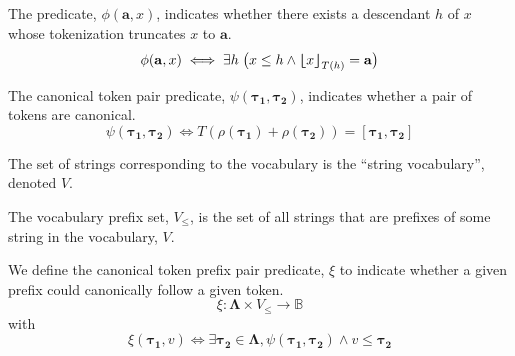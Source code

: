 \begin{definition}
    The predicate, $\phi(\mathbf{a}, x)$, indicates whether there exists a descendant $h$ of $x$
    whose tokenization truncates $x$ to $\mathbf{a}$.
    $$
    \phi(\mathbf{a}, x)
    \iff
    \exists h \;\bigl( x \leq h \land {\bm{\lfloor}} x {\bm{\rfloor}}_{T(h)} = \mathbf{a} \bigr)
    $$
\end{definition}

\begin{definition}
    The canonical token pair predicate, $\psi(\boldsymbol{\tau_1}, \boldsymbol{\tau_2})$, indicates whether a pair of tokens are canonical.
    $$
    \psi(\boldsymbol{\tau_1}, \boldsymbol{\tau_2})
    \iff
    T(\rho(\boldsymbol{\tau_1}) + \rho(\boldsymbol{\tau_2})) = [\boldsymbol{\tau_1}, \boldsymbol{\tau_2}]
    $$
\end{definition}

\begin{definition}
    The set of strings corresponding to the vocabulary
    is the ``string vocabulary'', denoted $V$.
\end{definition}

\begin{definition}
    The vocabulary prefix set, $V_{\leq}$,
    is the set of all strings that are prefixes of some string in the vocabulary, $V$.
\end{definition}

\begin{definition}
    We define the canonical token prefix pair predicate, $\xi$ to indicate whether a given prefix could canonically follow a given token.
    $$
    \xi : \boldsymbol{\Lambda} \times V_\leq \to \mathbb{B}
    $$
    with
    $$
    \xi(\boldsymbol{\tau_1}, v) \iff \exists \boldsymbol{\tau_2} \in \boldsymbol{\Lambda}, \psi(\boldsymbol{\tau_1}, \boldsymbol{\tau_2}) \land v \leq \boldsymbol{\tau_2}
    $$
\end{definition}

